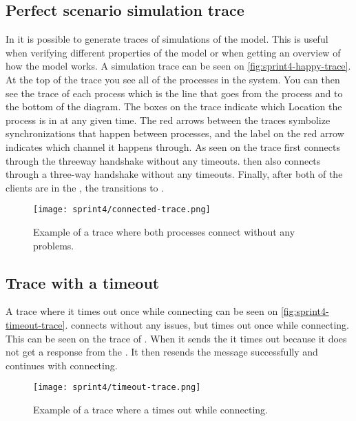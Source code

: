 \subsection{Perfect scenario simulation trace}
In \uppaal it is possible to generate traces of simulations of the model. 
This is useful when verifying different properties of the model or when getting an overview of how the model works.
A simulation trace can be seen on \autoref{fig:sprint4-happy-trace}.
At the top of the trace you see all of the processes in the system.
You can then see the trace of each process which is the line that goes from the process and to the bottom of the diagram.
The boxes on the trace indicate which Location the process is in at any given time.
The red arrows between the traces symbolize synchronizations that happen between processes, and the label on the red arrow indicates which channel it happens through.
As seen on the trace  first connects through the threeway handshake without any timeouts.
 then also connects through a three-way handshake without any timeouts.
Finally, after both of the clients are in the , the  transitions to .
\begin{figure}[H]
    \centering
    \texttt{[image: sprint4/connected-trace.png]}
    \caption{Example of a trace where both  processes connect without any problems.}
    \label{fig:sprint4-happy-trace}
\end{figure}

\subsection{Trace with a timeout}
A trace where it times out once while connecting can be seen on \autoref{fig:sprint4-timeout-trace}.
 connects without any issues, but  times out once while connecting.
This can be seen on the trace of . When it sends the  it times out because it does not get a response from the .
It then resends the message successfully and continues with connecting.
\begin{figure}[H]
    \centering
    \texttt{[image: sprint4/timeout-trace.png]}
    \caption{Example of a trace where a  times out while connecting.}
    \label{fig:sprint4-timeout-trace}
\end{figure}
